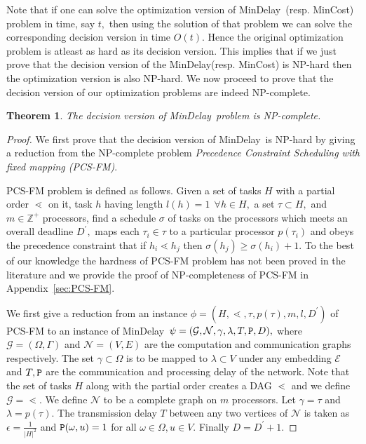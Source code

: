 \documentclass[journal]{IEEEtran}
\newtheorem{theorem}{{\bf Theorem}}
\newcommand{\net}{\mathcal{N}}
\newcommand{\netnodes}{V}
\newcommand{\netedges}{E}
\newcommand{\compgraph}{\mathcal{G}}
\newcommand{\compnodes}{\Omega}
\newcommand{\compedges}{\Gamma}
\newcommand{\mincost}{\textsf{MinCost}}
\newcommand{\mindelay}{\textsf{MinDelay}}
\newcommand{\embedding}{\mathcal{E}}
\begin{document}
Note that if one can solve the optimization version of \mindelay\
(resp. \mincost) problem in time, say $t,$ then using the solution of
that problem we can solve the corresponding decision version in time
$O(t).$ Hence the original optimization problem is atleast as hard as
its decision version. This implies that if we just prove that the
decision version of the \mindelay (resp. \mincost) is NP-hard then the
optimization version is also NP-hard. We now proceed to prove that the
decision version of our optimization problems are indeed NP-complete.

\begin{theorem}
\label{thm:delay}
The decision version of \mindelay\ problem is NP-complete.
\end{theorem}

\begin{proof}
  We first prove that the decision version of \mindelay\ is NP-hard by
  giving a reduction from the NP-complete problem \textit{Precedence
    Constraint Scheduling with fixed mapping (PCS-FM)}\cite{Garey79}.

  PCS-FM problem is defined as follows. Given a set of tasks $H$ with
  a partial order $\lessdot$ on it, task $h$ having length $l(h) = 1 \
  \ \forall h \in H,$ a set $\tau \subset H,$ and $m \in
  \mathbb{Z}^{+}$ processors, find a schedule $\sigma$ of tasks on the
  processors which meets an overall deadline $D^{\prime},$ maps each
  $\tau_i \in \tau$ to a particular processor $p(\tau_i)$ and obeys
  the precedence constraint that if $h_i \lessdot h_j$ then
  $\sigma(h_j) \geq \sigma(h_i) + 1.$ To the best of our knowledge the
  hardness of PCS-FM problem has not been proved in the literature and
  we provide the proof of NP-completeness of PCS-FM in Appendix~\ref{sec:PCS-FM}. 

  We first give a reduction from an instance $\phi =
  (H,\lessdot,\tau,p(\tau),m,l,D^{\prime})$ of PCS-FM to an instance
  of \mindelay\ $\psi =
  (\compgraph,\net,\gamma,\lambda,T,\processingwt,D),$ where
  $\compgraph = (\compnodes,\compedges)$ and $\net =
  (\netnodes,\netedges)$ are the computation and communication graphs
  respectively. The set $\gamma \subset \compnodes$ is to be mapped to
  $\lambda \subset \netnodes$ under any embedding $\embedding$ and
  $T,\mathtt{P}$ are the communication and processing delay of the
  network. Note that the set of tasks $H$ along with the partial order
  creates a DAG $\lessdot$ and we define $\compgraph = \lessdot.$ We
  define $\net$ to be a complete graph on $m$ processors. Let $\gamma
  = \tau$ and $\lambda = p(\tau).$ The transmission delay $T$ between
  any two vertices of $\net$ is taken as $\epsilon = \frac{1}{|H|^2}$
  and $\mathtt{P}(\omega,u) = 1$ for all $\omega \in \compnodes, u
  \in \netnodes.$ Finally $D=D^{\prime} +1.$


\end{proof}
\end{document}

